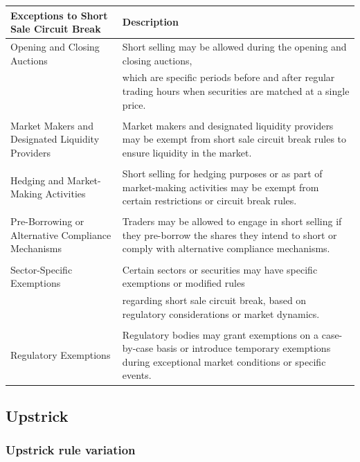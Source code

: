 \documentclass[11pt]{article}
\begin{document}
\begin{enumerate}
\begin{center}
\begin{tabular}{ll}
\hline
Exceptions to Short Sale Circuit Break & Description\\[0pt]
\hline
Opening and Closing Auctions & Short selling may be allowed during the opening and closing auctions,\\[0pt]
 & which are specific periods before and after regular trading hours when securities are matched at a single price.\\[0pt]
 & \\[0pt]
Market Makers and Designated Liquidity Providers & Market makers and designated liquidity providers may be exempt from short sale circuit break rules to ensure liquidity in the market.\\[0pt]
 & \\[0pt]
Hedging and Market-Making Activities & Short selling for hedging purposes or as part of market-making activities may be exempt from certain restrictions or circuit break rules.\\[0pt]
 & \\[0pt]
Pre-Borrowing or Alternative Compliance Mechanisms & Traders may be allowed to engage in short selling if they pre-borrow the shares they intend to short or comply with alternative compliance mechanisms.\\[0pt]
 & \\[0pt]
Sector-Specific Exemptions & Certain sectors or securities may have specific exemptions or modified rules\\[0pt]
 & regarding short sale circuit break, based on regulatory considerations or market dynamics.\\[0pt]
 & \\[0pt]
Regulatory Exemptions & Regulatory bodies may grant exemptions on a case-by-case basis or introduce temporary exemptions during exceptional market conditions or specific events.\\[0pt]
\hline
\end{tabular}
\end{center}
\end{enumerate}

\subsection{Upstrick}
\label{sec:org1dad46a}
\subsubsection{Upstrick rule variation}
\label{sec:org04579df}
\end{document}
